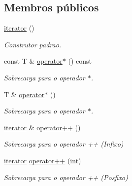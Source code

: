 \subsection*{Membros públicos}
\begin{DoxyCompactItemize}
\item 
\hyperlink{class_forward__list_1_1iterator_a969fbd51b73fadce7cb1d70374853d00}{iterator} ()\hypertarget{class_forward__list_1_1iterator_a969fbd51b73fadce7cb1d70374853d00}{}\label{class_forward__list_1_1iterator_a969fbd51b73fadce7cb1d70374853d00}

\begin{DoxyCompactList}\small\item\em Construtor padrao. \end{DoxyCompactList}\item 
const T \& \hyperlink{class_forward__list_1_1iterator_a29fa5d1fb4101a2eff9e69af91375cea}{operator$\ast$} () const \hypertarget{class_forward__list_1_1iterator_a29fa5d1fb4101a2eff9e69af91375cea}{}\label{class_forward__list_1_1iterator_a29fa5d1fb4101a2eff9e69af91375cea}

\begin{DoxyCompactList}\small\item\em Sobrecarga para o operador $\ast$. \end{DoxyCompactList}\item 
T \& \hyperlink{class_forward__list_1_1iterator_a7adb38a0c3fa47cd3f482093137b5286}{operator$\ast$} ()\hypertarget{class_forward__list_1_1iterator_a7adb38a0c3fa47cd3f482093137b5286}{}\label{class_forward__list_1_1iterator_a7adb38a0c3fa47cd3f482093137b5286}

\begin{DoxyCompactList}\small\item\em Sobrecarga para o operador $\ast$. \end{DoxyCompactList}\item 
\hyperlink{class_forward__list_1_1iterator}{iterator} \& \hyperlink{class_forward__list_1_1iterator_adc23300020d416752ff5c7bce13523ad}{operator++} ()\hypertarget{class_forward__list_1_1iterator_adc23300020d416752ff5c7bce13523ad}{}\label{class_forward__list_1_1iterator_adc23300020d416752ff5c7bce13523ad}

\begin{DoxyCompactList}\small\item\em Sobrecarga para o operador ++ (Infixo) \end{DoxyCompactList}\item 
\hyperlink{class_forward__list_1_1iterator}{iterator} \hyperlink{class_forward__list_1_1iterator_a6a0ccccd9b78ebdd72715e20b2fd62f4}{operator++} (int)\hypertarget{class_forward__list_1_1iterator_a6a0ccccd9b78ebdd72715e20b2fd62f4}{}\label{class_forward__list_1_1iterator_a6a0ccccd9b78ebdd72715e20b2fd62f4}

\begin{DoxyCompactList}\small\item\em Sobrecarga para o operador ++ (Posfixo) \end{DoxyCompactList}\end{DoxyCompactItemize}
